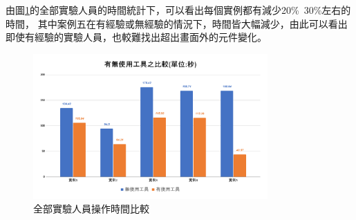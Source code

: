 由圖\ref{f4.9}的全部實驗人員的時間統計下，可以看出每個實例都有減少20\%~30\%左右的時間，
其中案例五在有經驗或無經驗的情況下，時間皆大幅減少，由此可以看出即使有經驗的實驗人員，也較難找出超出畫面外的元件變化。

\begin{figure}[H]
    \centering
    \includegraphics[width=0.8\textwidth]{picture/experiment/ch4-all_compare.png}
    \caption{全部實驗人員操作時間比較}
    \label{f4.9}
\end{figure}



















